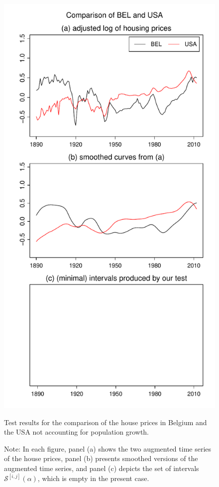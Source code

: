 \documentclass[a4paper,12pt]{article}
\begin{document}
\begin{enumerate}[label=\arabic*.,leftmargin=0.6cm]
\begin{figure}[t!]
\hspace{0.1cm}
\begin{minipage}[t]{0.48\textwidth}
\includegraphics[width=\textwidth]{../output/BEL_vs_USA}
\caption{Test results for the comparison of the house prices in Belgium and the USA not accounting for population growth.}\label{fig:hp:Belgium:USA}
\end{minipage}
\caption*{Note: In each figure, panel (a) shows the two augmented time series of the house prices, panel (b) presents smoothed versions of the augmented time series, and panel (c) depicts the set of intervals $\mathcal{S}^{[i, j]}(\alpha)$, which is empty in the present case.}
\end{figure}


\end{enumerate}
\end{document}

